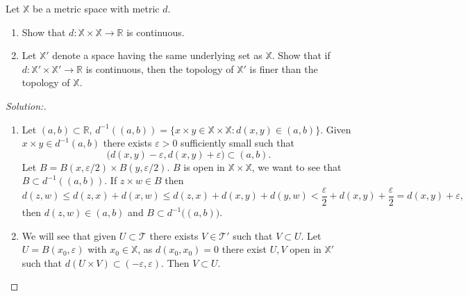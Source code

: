 \documentclass[a4paper,12pt, reqno]{article}
\theoremstyle{definition}
\newenvironment{exerr}[1]{
  \renewcommand\theexeralt{#1}
  \exeralt
}{\endexeralt}
\newenvironment{solution}{\begin{proof}[Solution:]}{\end{proof}}
\newcommand{\R}{\mathbb{R}}
\newcommand{\T}{\mathscr{T}}
\newcommand{\X}{\mathbb{X}}
\begin{document}
\begin{exerr}{3}
  Let $\X$ be a metric space with metric $d$.
  \begin{enumerate}[label=(\alph*)]
    \item Show that $d:\X\times\X\to\R$ is continuous.
    \item Let $\X'$ denote a space having the same underlying set as $\X$. Show that if $d:\X'\times\X'\to\R$ is continuous, then the topology of $\X'$ is finer than the topology of $\X$.
  \end{enumerate}
\end{exerr}
\begin{solution}\hfill
  \begin{enumerate}[label=(\alph*)]
    \item Let $(a,b)\subset\R$, $d^{-1}((a,b)) = \{ x\times y\in\X\times\X : d(x,y)\in(a,b) \}$. Given $x\times y\in d^{-1}(a,b)$ there exists $\varepsilon>0$ sufficiently small such that
          \begin{equation*}
            \big( d(x,y)-\varepsilon,d(x,y)+\varepsilon \big)\subset(a,b).
          \end{equation*}
          Let $B = B(x,\varepsilon/2)\times B(y,\varepsilon/2)$. $B$ is open in $\X\times\X$, we want to see that $B\subset d^{-1}((a,b))$. If $z\times w\in B$ then
          \begin{equation*}
            d(z,w)\leq d(z,x) + d(x,w) \leq d(z,x)+d(x,y)+d(y,w)< \frac{\varepsilon}{2} + d(x,y) + \frac{\varepsilon}{2} = d(x,y)+\varepsilon,
          \end{equation*}
          then $d(z,w)\in (a,b)$ and $B\subset d^{-1}\big( (a,b) \big)$.
    \item We will see that given $U\subset\T$ there exists $V\in\T'$ such that $V\subset U$. Let $U = B(x_{0},\varepsilon)$ with $x_{0}\in\X$, as $d(x_{0},x_{0})=0$ there exist $U, V$ open in $\X'$ such that $d(U\times V)\subset(-\varepsilon,\varepsilon)$. Then $V\subset U$.
  \end{enumerate}
\end{solution}
\end{document}
